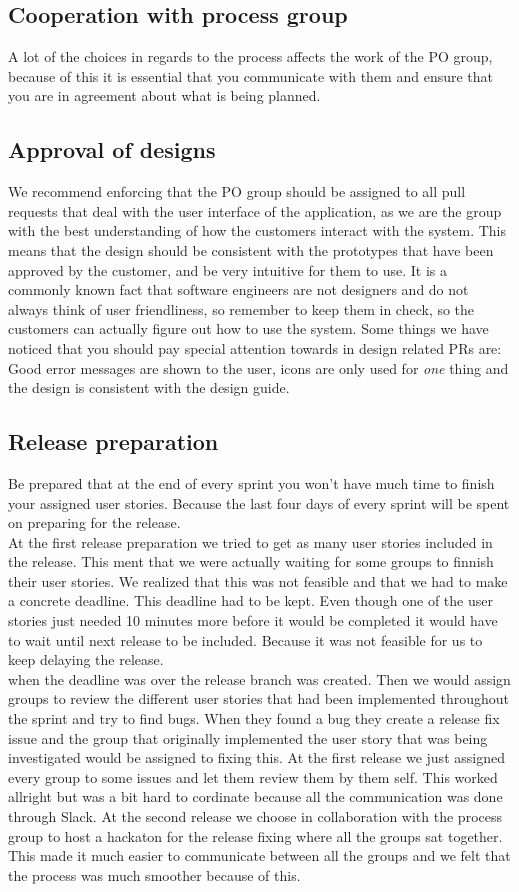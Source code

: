 \subsection{Cooperation with process group}
A lot of the choices in regards to the process affects the work of the PO group, because of this it is essential that you communicate with them and ensure that you are in agreement about what is being planned.

\subsection{Approval of designs}
We recommend enforcing that the PO group should be assigned to all pull requests that deal with the user interface of the application, as we are the group with the best understanding of how the customers interact with the system.
This means that the design should be consistent with the prototypes that have been approved by the customer, and be very intuitive for them to use.
It is a commonly known fact that software engineers are not designers and do not always think of user friendliness, so remember to keep them in check, so the customers can actually figure out how to use the system.
Some things we have noticed that you should pay special attention towards in design related PRs are: Good error messages are shown to the user, icons are only used for \textit{one} thing and the design is consistent with the design guide.

\subsection{Release preparation}
Be prepared that at the end of every sprint you won't have much time to finish your assigned user stories. Because the last four days of every sprint will be spent on preparing for the release.
\\
At the first release preparation we tried to get as many user stories included in the release. This ment that we were actually waiting for some groups to finnish their user stories. We realized that this was not feasible and that we had to make a concrete deadline. This deadline had to be kept. Even though one of the user stories just needed 10 minutes more before it would be completed it would have to wait until next release to be included. Because it was not feasible for us to keep delaying the release.
\\
when the deadline was over the release branch was created. Then we would assign groups to review the different user stories that had been implemented throughout the sprint and try to find bugs. When they found a bug they create a release fix issue and the group that originally implemented the user story that was being investigated would be assigned to fixing this. At the first release we just assigned every group to some issues and let them review them by them self. This worked allright but was a bit hard to cordinate because all the communication was done through Slack. At the second release we choose in collaboration with the process group to host a hackaton for the release fixing where all the groups sat together. This made it much easier to communicate between all the groups and we felt that the process was much smoother because of this.

